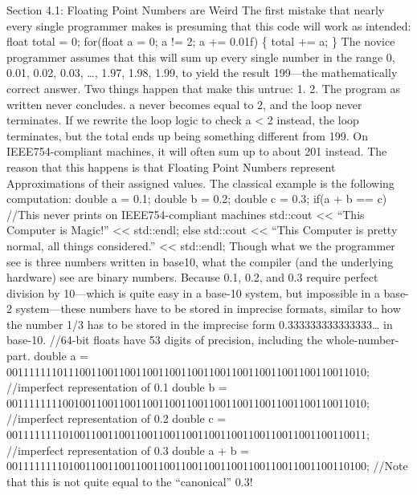 Section 4.1: Floating Point Numbers are Weird The ﬁrst mistake that
nearly every single programmer makes is presuming that this code will
work as intended: float total = 0; for(float a = 0; a != 2; a += 0.01f)
\{ total += a; \} The novice programmer assumes that this will sum up
every single number in the range 0, 0.01, 0.02, 0.03, \ldots, 1.97,
1.98, 1.99, to yield the result 199---the mathematically correct answer.
Two things happen that make this untrue: 1. 2. The program as written
never concludes. a never becomes equal to 2, and the loop never
terminates. If we rewrite the loop logic to check a \textless{} 2
instead, the loop terminates, but the total ends up being something
diﬀerent from 199. On IEEE754-compliant machines, it will often sum up
to about 201 instead. The reason that this happens is that Floating
Point Numbers represent Approximations of their assigned values. The
classical example is the following computation: double a = 0.1; double b
= 0.2; double c = 0.3; if(a + b == c) //This never prints on
IEEE754-compliant machines std::cout \textless\textless{} ``This
Computer is Magic!'' \textless\textless{} std::endl; else std::cout
\textless\textless{} ``This Computer is pretty normal, all things
considered.'' \textless\textless{} std::endl; Though what we the
programmer see is three numbers written in base10, what the compiler
(and the underlying hardware) see are binary numbers. Because 0.1, 0.2,
and 0.3 require perfect division by 10---which is quite easy in a
base-10 system, but impossible in a base-2 system---these numbers have
to be stored in imprecise formats, similar to how the number 1/3 has to
be stored in the imprecise form 0.333333333333333\ldots{} in base-10.
//64-bit floats have 53 digits of precision, including the
whole-number-part. double a =
0011111110111001100110011001100110011001100110011001100110011010;
//imperfect representation of 0.1 double b =
0011111111001001100110011001100110011001100110011001100110011010;
//imperfect representation of 0.2 double c =
0011111111010011001100110011001100110011001100110011001100110011;
//imperfect representation of 0.3 double a + b =
0011111111010011001100110011001100110011001100110011001100110100; //Note
that this is not quite equal to the ``canonical'' 0.3!
